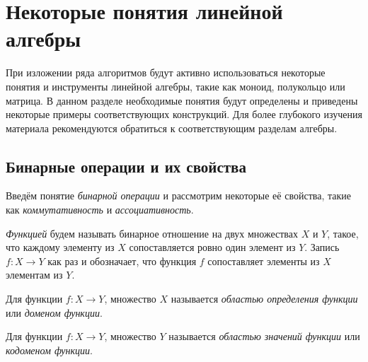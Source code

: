 \chapter[Некоторые понятия линейной алгебры]{Некоторые понятия линейной алгебры}\label{chpt:LinAlIntro}

При изложении ряда алгоритмов будут активно использоваться некоторые понятия и инструменты линейной алгебры, такие как моноид, полукольцо или матрица.
В данном разделе необходимые понятия будут определены и приведены некоторые примеры соответствующих конструкций. Для более глубокого изучения материала рекомендуются обратиться к соответствующим разделам алгебры.


\section{Бинарные операции и их свойства}


Введём понятие \textit{бинарной операции} и рассмотрим некоторые её свойства, такие как \textit{коммутативность} и \textit{ассоциативность}.

\begin{definition}
	\textit{Функцией} будем называть бинарное отношение на двух множествах $X$ и $Y$, такое, что каждому элементу из $X$ сопоставляется ровно один элемент из $Y$. Запись $f: X \to Y$ как раз и обозначает, что функция $f$ сопоставляет элементы из $X$ элементам из $Y$.
\end{definition}

\begin{definition}
	Для функции $f: X \to Y$, множество $X$ называется \textit{областью определения функции} или \textit{доменом функции}.
\end{definition}

\begin{definition}
	Для функции $f: X \to Y$, множество $Y$ называется \textit{областью значений функции} или \textit{кодоменом функции}.
\end{definition}

